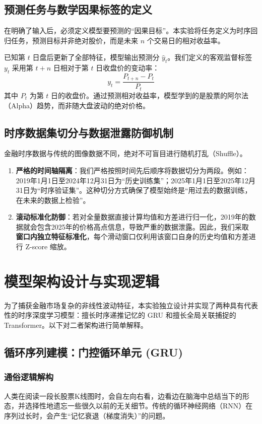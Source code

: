 \documentclass[9pt,a4paper,twoside]{rho-class/rho}
\begin{document}
    \subsection{预测任务与数学因果标签的定义}
    在明确了输入后，必须定义模型要预测的“因果目标”。本实验将任务定义为时序回归任务，预测目标并非绝对股价，而是未来 $n$ 个交易日的相对收益率。
    
    已知第 $t$ 日盘后更新了全部特征，模型输出预测分 $\hat{y}_t$。我们定义的客观监督标签 $y_t$ 采用第 $t+n$ 日相对于第 $t$ 日收盘价的变动率：
    \begin{equation}
        y_t = \frac{P_{t+n} - P_t}{P_t}
    \end{equation}
    其中 $P_t$ 为第 $t$ 日的收盘价。通过预测相对收益率，模型学到的是股票的阿尔法（Alpha）趋势，而非随大盘波动的绝对价格。

    \subsection{时序数据集切分与数据泄露防御机制}
    金融时序数据与传统的图像数据不同，绝对不可盲目进行随机打乱（Shuffle）。
    \begin{enumerate}
        \item \textbf{严格的时间轴隔离}：我们严格按照时间先后顺序将数据切分为两段。例如：2019年1月1日至2024年12月31日为“历史训练集”；2025年1月1日至2025年12月31日为“时序验证集”。这种切分方式确保了模型始终是“用过去的数据训练，在未来的数据上检验”。
        \item \textbf{滚动标准化防御}：若对全量数据直接计算均值和方差进行归一化，2019年的数据就会包含2025年的价格高点信息，导致严重的数据泄露。因此，我们采取 \textbf{窗口内独立特征标准化}，每个滑动窗口仅利用该窗口自身的历史均值和方差进行 Z-score 缩放。
    \end{enumerate}

\section{模型架构设计与实现逻辑}
为了捕获金融市场复杂的非线性波动特征，本实验独立设计并实现了两种具有代表性的时序深度学习模型：擅长时序递推记忆的 GRU 和擅长全局关联捕捉的 Transformer。以下对二者架构进行简单解释。

    \subsection{循环序列建模：门控循环单元 (GRU)}
    \subsubsection{通俗逻辑解构}
    人类在阅读一段长股票K线图时，会自左向右看，边看边在脑海中总结当下的形态，并选择性地遗忘一些很久以前的无关细节。传统的循环神经网络（RNN）在序列过长时，会产生“记忆衰退（梯度消失）”的问题。
    
\end{document}
